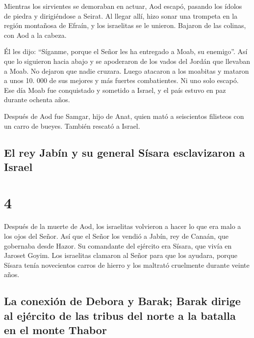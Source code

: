  Mientras los sirvientes se demoraban en actuar, Aod
escapó, pasando los ídolos de piedra y dirigiéndose a Seirat.
 Al llegar allí, hizo sonar una trompeta en la región
montañosa de Efraín, y los israelitas se le unieron. Bajaron de las
colinas, con Aod a la cabeza.

 Él les dijo: ``Síganme, porque el Señor les ha entregado
a Moab, su enemigo''. Así que lo siguieron hacia abajo y se apoderaron
de los vados del Jordán que llevaban a Moab. No dejaron que nadie
cruzara.  Luego atacaron a los moabitas y mataron a unos
10. 000 de sus mejores y más fuertes combatientes. Ni uno solo escapó.
 Ese día Moab fue conquistado y sometido a Israel, y el
país estuvo en paz durante ochenta años.

 Después de Aod fue Samgar, hijo de Anat, quien mató a
seiscientos filisteos con un carro de bueyes. También rescató a Israel.

\hypertarget{el-rey-jabuxedn-y-su-general-suxedsara-esclavizaron-a-israel}{%
\subsection{El rey Jabín y su general Sísara esclavizaron a
Israel}\label{el-rey-jabuxedn-y-su-general-suxedsara-esclavizaron-a-israel}}

\hypertarget{section-3}{%
\section{4}\label{section-3}}

 Después de la muerte de Aod, los israelitas volvieron a
hacer lo que era malo a los ojos del Señor.  Así que el
Señor los vendió a Jabín, rey de Canaán, que gobernaba desde Hazor. Su
comandante del ejército era Sísara, que vivía en Jaroset Goyim.
 Los israelitas clamaron al Señor para que los ayudara,
porque Sísara tenía novecientos carros de hierro y los maltrató
cruelmente durante veinte años.

\hypertarget{la-conexiuxf3n-de-debora-y-barak-barak-dirige-al-ejuxe9rcito-de-las-tribus-del-norte-a-la-batalla-en-el-monte-thabor}{%
\subsection{La conexión de Debora y Barak; Barak dirige al ejército de
las tribus del norte a la batalla en el monte
Thabor}\label{la-conexiuxf3n-de-debora-y-barak-barak-dirige-al-ejuxe9rcito-de-las-tribus-del-norte-a-la-batalla-en-el-monte-thabor}}

